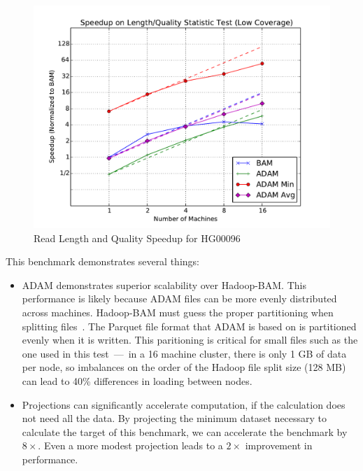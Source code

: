 \documentclass[10pt,twocolumn]{article}
\theoremstyle{plain}
\begin{document}
\begin{figure}[h]
\begin{center}
\includegraphics[width=\linewidth]{microbenchmarks/length_and_quality_low_coverage.pdf}
\end{center}
\caption{Read Length and Quality Speedup for HG00096}
\label{fig:length-quality}
\end{figure}

This benchmark demonstrates several things:

\begin{itemize}
\item ADAM demonstrates superior scalability over Hadoop-BAM. This performance is likely because ADAM files can be more evenly distributed across machines.
Hadoop-BAM must guess the proper partitioning when splitting files~\cite{niemenmaa12}. The Parquet file format that ADAM is based on is partitioned
evenly when it is written\cite{parquet}. This paritioning is critical for small files such as the one used in this test~---~in a 16 machine cluster, there is only 1 GB of
data per node, so imbalances on the order of the Hadoop file split size (128 MB) can lead to 40\% differences in loading between nodes.
\item Projections can significantly accelerate computation, if the calculation does not need all the data. By projecting the minimum dataset necessary
to calculate the target of this benchmark, we can accelerate the benchmark by $8\times$. Even a more modest projection leads to a $2\times$
improvement in performance.
\end{itemize}
\end{document}
